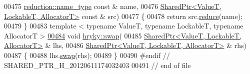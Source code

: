 \begin{DoxyCode}
00475     \hyperlink{classhryky_1_1reduction_1_1_string}{reduction::name_type} \textcolor{keyword}{const} & name,
00476     \hyperlink{classhryky_1_1_shared_ptr}{SharedPtr<ValueT, LockableT, AllocatorT>} \textcolor{keyword}{const} & src)
00477 \{
00478     \textcolor{keywordflow}{return} src.\hyperlink{classhryky_1_1_shared_ptr_a27d2068eec13586b1998d337eceffbad}{reduce}(name);
00479 \}
00483 \textcolor{keyword}{template} < \textcolor{keyword}{typename} ValueT, \textcolor{keyword}{typename} LockableT, \textcolor{keyword}{typename} AllocatorT >
\hypertarget{shared__ptr_8h_source_l00484}{}\hyperlink{namespacehryky_a9b664f13ed500d03858655608fb26a2b}{00484} \textcolor{keywordtype}{void} \hyperlink{namespacehryky_a4282146df5ea2b68cb667896a2205909}{hryky::swap}(
00485     \hyperlink{classhryky_1_1_shared_ptr}{SharedPtr<ValueT, LockableT, AllocatorT>} & lhs,
00486     \hyperlink{classhryky_1_1_shared_ptr}{SharedPtr<ValueT, LockableT, AllocatorT>} & rhs)
00487 \{
00488     lhs.\hyperlink{classhryky_1_1_shared_ptr_a31ff2b6615bf4240b3ec8bcbcc06acc0}{swap}(rhs);
00489 \}
00490 \textcolor{preprocessor}{#endif // SHARED\_PTR\_H\_20120611174032403}
00491 \textcolor{preprocessor}{}\textcolor{comment}{// end of file}
\end{DoxyCode}

